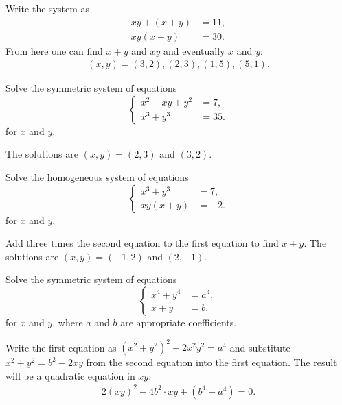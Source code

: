 \documentclass[12pt,a4paper]{memoir}
\theoremstyle{definition}
\begin{document}
\begin{solution}
	Write the system as
	\begin{align*}
		xy+(x+y) &= 11,\\xy(x+y) &=30.
	\end{align*}
	From here one can find $x+y$ and $xy$ and eventually $x$ and $y$:
	\begin{align*}
		(x,y) = (3,2), (2,3), (1,5), (5,1).
	\end{align*}
\end{solution}


\begin{question}\label{p:sys-eq-B}
	Solve the symmetric system of equations $$\begin{cases}
		x^2-xy+y^2 &= 7,\\x^3+y^3 &=35.
	\end{cases}$$ for $x$ and $y$.
\end{question}


\begin{solution}
	The solutions are $(x,y)=(2,3)$ and $(3,2)$.
\end{solution}



\begin{question}\label{p:sys-eq-C}
	Solve the homogeneous system of equations $$\begin{cases}
		x^3+y^3 &=7,\\ xy(x+y) &= -2.
	\end{cases}$$ for $x$ and $y$.
\end{question}


\begin{solution}
	Add three times the second equation to the first equation to find $x+y$. The solutions are $(x,y)=(-1,2)$ and $(2,-1)$.
\end{solution}


\begin{question}\label{p:sys-eq-D}
	Solve the symmetric system of equations $$\begin{cases}
		x^4+y^4 &= a^4,\\ x+y &= b.
	\end{cases}$$ for $x$ and $y$, where $a$ and $b$ are appropriate coefficients. 
\end{question}


\begin{solution}
	Write the first equation as $(x^2+y^2)^2-2x^2y^2=a^4$ and substitute $x^2+y^2=b^2-2xy$ from the second equation into the first equation. The result will be a quadratic equation in $xy$:
	\begin{align*}
		2(xy)^2 - 4b^2\cdot xy + (b^4-a^4)=0.
	\end{align*}
\end{solution}
\end{document}
